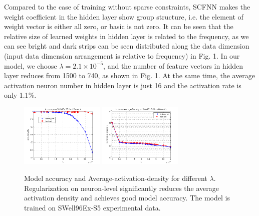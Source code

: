 Compared to the case of training without sparse constraints, SCFNN makes the weight coefficient in the hidden layer show group structure, i.e. the element of weight vector is either all zero, or basic is not zero.
It can be seen that the relative size of learned weights in hidden layer is related to the frequency, as we can see bright and dark strips can be seen distributed along the data dimension (input data dimension arrangement is relative to frequency) in Fig. 1.
In our model, we choose $\lambda=2.1 \times 10^{-5} $, and the number of feature vectors in hidden layer reduces from 1500 to 740, as shown in Fig. 1. At the same time, the average activation neuron number in hidden layer is just 16 and the activation rate is only 1.1{\%}.
\begin{figure}
\includegraphics[width=4cm,height=3cm]{figure/Accuracy_on_SWellEx_S5_for_different_lambda}
\includegraphics[width=4cm,height=3cm]{figure/Hidden_Average_Density_on_SWellEx_S5_for_different_lambda}
\caption{Model accuracy and Average-activation-density for different $\lambda $. Regularization on neuron-level
significantly reduces the average activation density and achieves good model accuracy. The model is trained on SWell96Ex-S5 experimental data.}
\end{figure}

